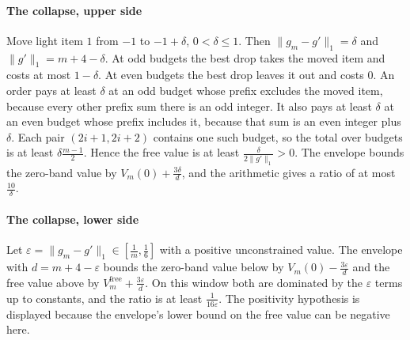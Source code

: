 
\paragraph{The collapse, upper side} Move light item $1$ from $-1$ to $-1+\delta$,
$0<\delta\le1$. Then $\|g_{m}-g'\|_{1}=\delta$ and $\|g'\|_{1}=m+4-\delta$. At odd budgets
the best drop takes the moved item and costs at most $1-\delta$. At even budgets the best
drop leaves it out and costs $0$. An order pays at least $\delta$ at an odd budget whose
prefix excludes the moved item, because every other prefix sum there is an odd integer. It
also pays at least $\delta$ at an even budget whose prefix includes it, because that sum is an
even integer plus $\delta$. Each pair $(2i+1,2i+2)$ contains one such budget, so the total
over budgets is at least $\delta\frac{m-1}{2}$. Hence the free value is at least
$\frac{\delta}{2\|g'\|_{1}}>0$. The envelope bounds the zero-band value by
$V_{m}(0)+\frac{3\delta}{d}$, and the arithmetic gives a ratio of at most
$\frac{10}{\delta}$.


\paragraph{The collapse, lower side} Let $\varepsilon=\|g_{m}-g'\|_{1}\in[\frac1m,\frac16]$
with a positive unconstrained value. The envelope with $d=m+4-\varepsilon$ bounds the
zero-band value below by $V_{m}(0)-\frac{3\varepsilon}{d}$ and the free value above by
$V^{\mathrm{free}}_{m}+\frac{3\varepsilon}{d}$. On this window both are dominated by the
$\varepsilon$ terms up to constants, and the ratio is at least $\frac{1}{16\varepsilon}$. The
positivity hypothesis is displayed because the envelope's lower bound on the free value can be
negative here.


